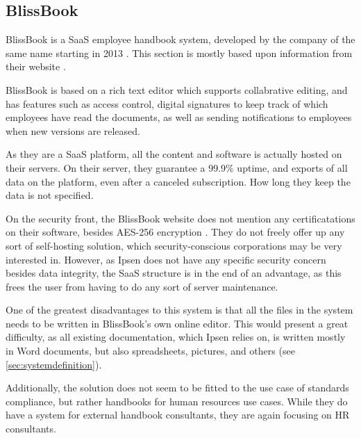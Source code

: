 \subsection{BlissBook}
BlissBook is a SaaS employee handbook system, developed by the company of the same name starting in 2013 \cite{BlissbookInfo}.
This section is mostly based upon information from their website \cite{BlissbookContents}.

BlissBook is based on a rich text editor which supports collabrative editing, and has features such as access control, digital signatures to keep track of which employees have read the documents, as well as sending notifications to employees when new versions are released.

As they are a SaaS platform, all the content and software is actually hosted on their servers.
On their server, they guarantee a 99.9\% uptime, and exports of all data on the platform, even after a canceled subscription.
How long they keep the data is not specified.

On the security front, the BlissBook website does not mention any certificatations on their software, besides  AES-256 encryption \cite{BlissbookSecurity}.
They do not freely offer up any sort of self-hosting solution, which security-conscious corporations may be very interested in.
However, as Ipsen does not have any specific security concern besides data integrity, the SaaS structure is in the end of an advantage, as this frees the user from having to do any sort of server maintenance.

One of the greatest disadvantages to this system is that all the files in the system needs to be written in BlissBook's own online editor.
This would present a great difficulty, as all existing documentation, which Ipsen relies on, is written mostly in Word documents, but also spreadsheets, pictures, and others (see \cref{sec:systemdefinition}).

Additionally, the solution does not seem to be fitted to the use case of standards compliance, but rather handbooks for human resources use cases.
While they do have a system for external handbook consultants, they are again focusing on HR consultants. \cite{BlissbookHandbook}

